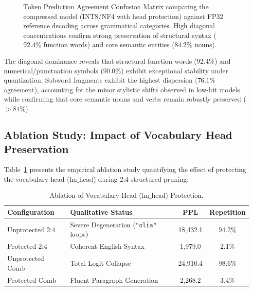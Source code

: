 \documentclass[conference]{IEEEtran}
\begin{document}
\begin{figure}[t]
\caption{Token Prediction Agreement Confusion Matrix comparing the compressed model (INT8/NF4 with head protection) against FP32 reference decoding across grammatical categories. High diagonal concentrations confirm strong preservation of structural syntax ($92.4\%$ function words) and core semantic entities ($84.2\%$ nouns).}
\label{fig:confusion_matrix}
\end{figure}

The diagonal dominance reveals that structural function words ($92.4\%$) and numerical/punctuation symbols ($90.0\%$) exhibit exceptional stability under quantization. Subword fragments exhibit the highest dispersion ($76.1\%$ agreement), accounting for the minor stylistic shifts observed in low-bit models while confirming that core semantic nouns and verbs remain robustly preserved ($>81\%$).

\subsection{Ablation Study: Impact of Vocabulary Head Preservation}
Table~\ref{tab:ablation} presents the empirical ablation study quantifying the effect of protecting the vocabulary head ($\text{lm\_head}$) during 2:4 structured pruning.

\begin{table}[h]
\centering
\caption{Ablation of Vocabulary-Head ($\text{lm\_head}$) Protection.}
\label{tab:ablation}
\begin{tabularx}{\columnwidth}{lXcc}
\toprule
\textbf{Configuration} & \textbf{Qualitative Status} & \textbf{PPL} & \textbf{Repetition} \\
\midrule
Unprotected 2:4 & Severe Degeneration (\texttt{"olia"} loops) & 18,432.1 & 94.2\% \\
Protected 2:4 & Coherent English Syntax & 1,979.0 & 2.1\% \\
Unprotected Comb & Total Logit Collapse & 24,910.4 & 98.6\% \\
Protected Comb & Fluent Paragraph Generation & 2,268.2 & 3.4\% \\
\bottomrule
\end{tabularx}
\end{table}
\end{document}
